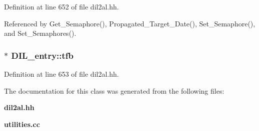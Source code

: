 Definition at line 652 of file dil2al.hh.

Referenced by Get\_\-Semaphore(), Propagated\_\-Target\_\-Date(), Set\_\-Semaphore(), and Set\_\-Semaphores().
\subsubsection{$\ast$ DIL\_\-entry::tfb\hspace{0.3cm}{\tt  [protected]}}\label{classDIL__entry_n1}




Definition at line 653 of file dil2al.hh.

The documentation for this class was generated from the following files:\begin{CompactItemize}
\item 
{\bf dil2al.hh}\item 
{\bf utilities.cc}\end{CompactItemize}
